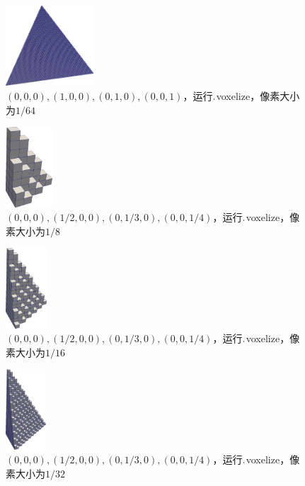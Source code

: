 \begin{figure}[!htbp]
  \centering
  \includegraphics[height=3cm]{fig/1/1.2/4.png}
    \caption{$(0,0,0),(1,0,0),(0,1,0),(0,0,1)$，运行$.\\$voxelize，像素大小为$1/64$}
  \label{fig:1-7}
\end{figure}

\begin{figure}[!htbp]
  \centering
  \includegraphics[height=3cm]{fig/1/1.2/5.png}
  \caption{$(0,0,0),(1/2,0,0),(0,1/3,0),(0,0,1/4)$，运行$.\\$voxelize，像素大小为$1/8$}
  \label{fig:1-7}
\end{figure}

\begin{figure}[!htbp]
  \centering
  \includegraphics[height=3cm]{fig/1/1.2/6.png}
    \caption{$(0,0,0),(1/2,0,0),(0,1/3,0),(0,0,1/4)$，运行$.\\$voxelize，像素大小为$1/16$}
  \label{fig:1-7}
\end{figure}

\begin{figure}[!htbp]
  \centering
  \includegraphics[height=3cm]{fig/1/1.2/7.png}
    \caption{$(0,0,0),(1/2,0,0),(0,1/3,0),(0,0,1/4)$，运行$.\\$voxelize，像素大小为$1/32$}
  \label{fig:1-7}
\end{figure}

